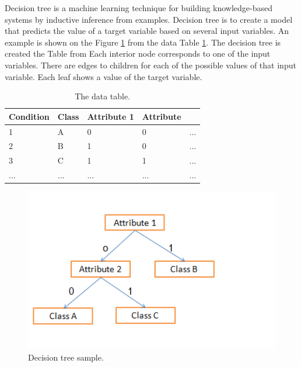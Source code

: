 Decision tree is a machine learning technique for building knowledge-based systems by inductive inference from examples. Decision tree is to create a model that predicts the value of a target variable based on several input variables. An example is shown on the Figure \ref{fig:decisiontreesample} from the data Table \ref{table:decisiontreesampletable}. The decision tree is created the Table from Each interior node corresponds to one of the input variables. There are edges to children for each of the possible values of that input variable. Each leaf shows a value of the target variable.
\begin{table}


  \begin{center}
    \begin{tabular}{ | l | l | l | l | l }
     \hline
    Condition & Class & Attribute 1 &  Attribute \\ \hline
    1 & A & 0 & 0 & ... \\ 
	2 & B & 1 & 0 & ... \\ 
	3 & C & 1 & 1 & ... \\ 
	... & ... & ... & ... & ... \\ 


    \end{tabular}
	\end{center}
     \caption{The data table.}
    \label{table:decisiontreesampletable}
\end{table}

\begin{figure}[httb]
\centering
\includegraphics[width=1\textwidth]{graph/decisiontreesample.png}
\caption{Decision tree sample.}
\label{fig:decisiontreesample}
\end{figure}

